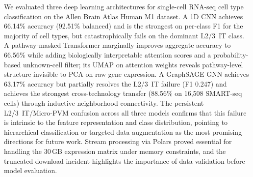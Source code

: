 \documentclass[11pt,letterpaper]{article}
\begin{document}
We evaluated three deep learning architectures for single-cell RNA-seq cell type
classification on the Allen Brain Atlas Human M1 dataset. A 1D CNN achieves
66.14\% accuracy (92.51\% balanced) and is the strongest on per-class F1 for
the majority of cell types, but catastrophically fails on the dominant L2/3~IT
class. A pathway-masked Transformer marginally improves aggregate accuracy to
66.56\% while adding biologically interpretable attention scores and a
probability-based unknown-cell filter; its UMAP on attention weights reveals
pathway-level structure invisible to PCA on raw gene expression. A GraphSAGE
GNN achieves 63.17\% accuracy but partially resolves the L2/3~IT failure
(F1 0.247) and achieves the strongest cross-technology transfer (88.56\% on
16,508 SMART-seq cells) through inductive neighborhood connectivity. The
persistent L2/3~IT/Micro-PVM confusion across all three models confirms that
this failure is intrinsic to the feature representation and class distribution,
pointing to hierarchical classification or targeted data augmentation as the
most promising directions for future work. Stream processing via Polars proved
essential for handling the 30\,GB expression matrix under memory constraints,
and the truncated-download incident highlights the importance of data validation
before model evaluation.
\end{document}
